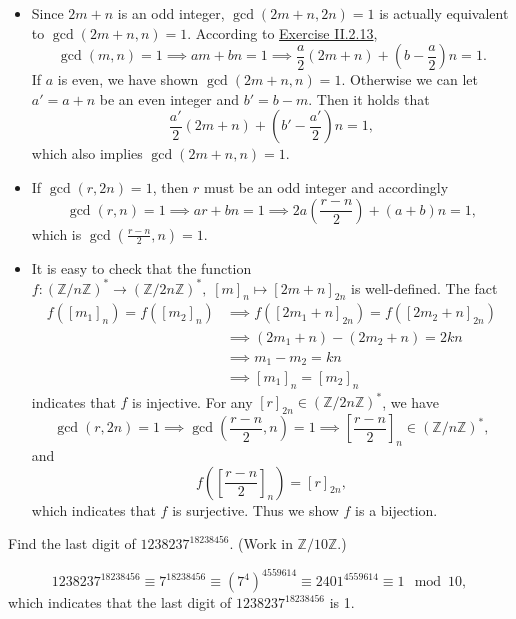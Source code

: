 \documentclass[12pt,letterpaper,boxed]{hmcpset}
\begin{document}
\begin{solution}
	\begin{itemize}
		\item Since $2m+n$ is an odd integer, $\gcd(2m+ n, 2n) = 1$ is actually equivalent to $\gcd(2m+ n, n) = 1$. According to \hyperlink{Exercise II.2.13}{Exercise II.2.13},
		\[
		\gcd(m, n) = 1\implies am+bn=1\implies \frac{a}{2}(2m+n)+\left(b-\frac{a}{2}\right)n=1.
		\]
		If $a$ is even, we have shown $\gcd(2m+ n, n) = 1$. Otherwise we can let $a'=a+n$ be an even integer and $b'=b-m$. Then it holds that
		\[
		\frac{a'}{2}(2m+n)+\left(b'-\frac{a'}{2}\right)n=1,
		\]
		which also implies $\gcd(2m+ n, n) = 1$.
		\item If $\gcd(r, 2n) = 1$, then $r$ must be an odd integer and accordingly
		\[
		\gcd(r, n) = 1\implies ar+bn=1\implies 2a \left(\frac{r-n}{2}\right)+(a+b)n=1,
		\]
		which is $\gcd(\frac{r-n}{2}, n) = 1$.
		\item It is easy to check that the function $f:(\mathbb{Z}/n\mathbb{Z})^*\rightarrow(\mathbb{Z}/2n\mathbb{Z})^*,\;[m]_n\mapsto[2m + n]_{2n}$ is well-defined. The fact
		\[
		\begin{aligned}
		f([m_1]_n)=f([m_2]_n)&\implies
		f([2m_1 + n]_{2n})=f([2m_2 + n]_{2n})\\
		&\implies (2m_1 + n)-(2m_2 + n)=2kn\\
		&\implies m_1-m_2=kn\\
		&\implies [m_1]_n=[m_2]_n
		\end{aligned}
		\]
		indicates that $f$ is injective. For any $[r]_{2n}\in(\mathbb{Z}/2n\mathbb{Z})^*$, we have
		\[
		\gcd(r, 2n) = 1\implies\gcd\left(\frac{r-n}{2},n\right) = 1\implies \left[\frac{r-n}{2}\right]_n\in(\mathbb{Z}/n\mathbb{Z})^*,
		\]
		and
		\[
		f\left(\left[\frac{r-n}{2}\right]_n\right)=[r]_{2n},
		\]
		which indicates that $f$ is surjective. Thus we show $f$ is a bijection.
	\end{itemize}
\end{solution}



\begin{problem}[2.16]	
	Find the last digit of $1238237^{18238456}$. (Work in $\mathbb{Z}/10\mathbb{Z}$.)
\end{problem}
\begin{solution}
	\[
	1238237^{18238456}\equiv7^{18238456}\equiv(7^4)^{4559614}\equiv2401^{4559614} \equiv 1 \mod 10,
	\]
	which indicates that the last digit of $1238237^{18238456}$ is 1.
\end{solution}
\end{document}
